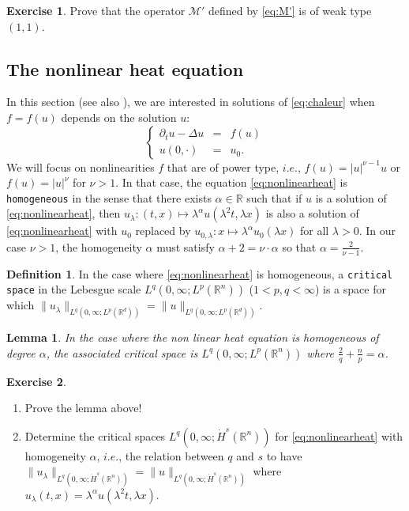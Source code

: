 \documentclass[a4paper, 12pt]{article}
\theoremstyle{plain}
\newtheorem{lemma}[proposition]{Lemma}
\theoremstyle{definition}
\newtheorem{definition}[proposition]{Definition}
\newtheorem{exercise}{Exercise}
\theoremstyle{remark}
\numberwithin{equation}{section}
\begin{document}
\begin{exercise}
Prove that the operator ${\mathscr{M}}'$ defined by \eqref{eq:M'} is of weak type $(1,1)$.
\end{exercise}

\subsection{The nonlinear heat equation}

In this section (see also \cite{Mo24}), we are interested in solutions of \eqref{eq:chaleur} when $f=f(u)$ depends on the solution $u$:
%
\begin{equation}
\label{eq:nonlinearheat}
\left\{
\begin{array}{rcl}
\partial_tu-\Delta u&=&f(u)\\
u(0,\cdot)&=&u_0.
\end{array}
\right.
\end{equation}
%
We will focus on nonlinearities $f$ that are of power type, $i.e.$, $f(u)=|u|^{\nu-1}u$ or $f(u)=|u|^\nu$ for $\nu>1$. In that case,
the equation \eqref{eq:nonlinearheat} is {\tt homogeneous} in the sense that there exists $\alpha\in{\mathds{R}}$ such that
if $u$ is a solution of \eqref{eq:nonlinearheat}, then $u_{\lambda}:(t,x)\mapsto \lambda^\alpha u(\lambda^2 t,\lambda x)$ is also a solution
of \eqref{eq:nonlinearheat} with $u_0$ replaced by $u_{0,\lambda}:x\mapsto \lambda^\alpha u_0(\lambda x)$ for all $\lambda >0$.
In our case $\nu>1$, the homogeneity $\alpha$ must satisfy $\alpha+2=\nu\cdot \alpha$ so that $\alpha=\frac{2}{\nu-1}$.

\begin{definition}
\label{def:critical}
In the case where \eqref{eq:nonlinearheat} is homogeneous, a {\tt critical space} in the Lebesgue scale
$L^q(0,\infty;L^p({\mathds{R}}^n))$ ($1<p,q<\infty$) is a space for which
$\|u_\lambda\|_{L^q(0,\infty;L^p({\mathds{R}}^d))}=\|u\|_{L^q(0,\infty;L^p({\mathds{R}}^d))}$.
\end{definition}

\begin{lemma}
In the case where the non linear heat equation is homogeneous of degree $\alpha$, the associated critical space
is $L^q(0,\infty;L^p({\mathds{R}}^n))$ where $\frac{2}{q}+\frac{n}{p}=\alpha$.
\end{lemma}

\begin{exercise}
\begin{enumerate}
\item
Prove the lemma above!
\item
Determine the critical spaces $L^q(0,\infty;\dot H^s({\mathds{R}}^n))$ for \eqref{eq:nonlinearheat} with homogeneity $\alpha$, $i.e.$,
the relation between $q$ and $s$ to have $\|u_\lambda\|_{L^q(0,\infty;\dot H^s({\mathds{R}}^n))}=\|u\|_{L^q(0,\infty;\dot H^s({\mathds{R}}^n))}$
where $u_\lambda(t,x)=\lambda^\alpha u(\lambda^2 t,\lambda x)$.
\end{enumerate}
\end{exercise}
\end{document}
